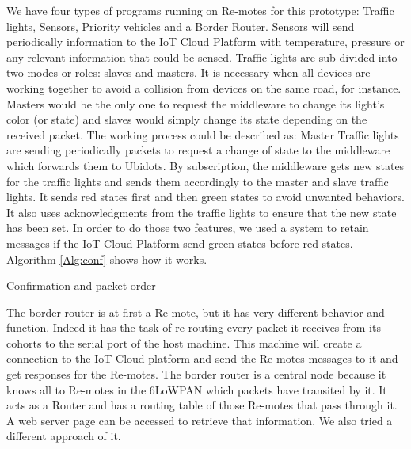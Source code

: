 We have four types of programs running on Re-motes for this prototype:
	Traffic lights,
	Sensors,
	Priority vehicles and a Border Router.
Sensors will send periodically information to the IoT Cloud Platform with temperature,
	pressure or any relevant information that could be sensed.
Traffic lights are sub-divided into two modes or roles:
	slaves and masters.
It is necessary when all devices are working together to avoid a collision from devices on the same road,
	for instance.
Masters would be the only one to request the middleware to change its light’s color (or state) and slaves would simply change its state depending on the received packet.
The working process could be described as:
	Master Traffic lights are sending periodically packets to request a change of state to the middleware which forwards them to Ubidots.
By subscription,
	the middleware gets new states for the traffic lights and sends them accordingly to the master and slave traffic lights.
It sends red states first and then green states to avoid unwanted behaviors.
It also uses acknowledgments from the traffic lights to ensure that the new state has been set.
In order to do those two features,
	we used a system to retain messages if the IoT Cloud Platform send green states before red states.
Algorithm \ref{Alg:conf} shows how it works.

\LinesNumbered \begin{algorithm}[ht] \caption{Confirmation and packet order\label{Alg:conf}}
\end{algorithm}

The border router is at first a Re-mote,
	but it has very different behavior and function.
Indeed it has the task of re-routing every packet it receives from its cohorts to the serial port of the host machine.
This machine will create a connection to the IoT Cloud platform and send the Re-motes messages to it and get responses for the Re-motes.
The border router is a central node because it knows all to Re-motes in the 6LoWPAN which packets have transited by it.
It acts as a Router and has a routing table of those Re-motes that pass through it.
A web server page can be accessed to retrieve that information.
We also tried a different approach of it.

